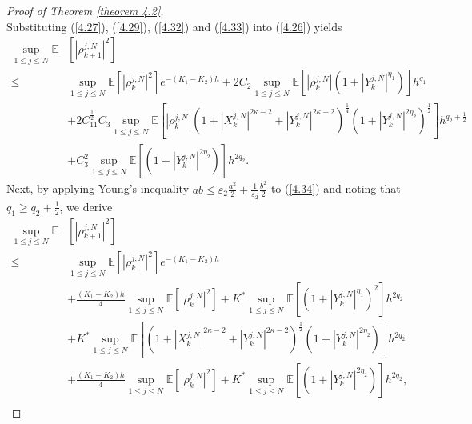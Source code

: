 \documentclass[12pt]{article}
\numberwithin{equation}{section}
\begin{document}
\begin{proof}[ Proof of Theorem \ref{theorem 4.2}]
\begin{equation}
\end{equation}
Substituting (\ref{4.27}), (\ref{4.29}), (\ref{4.32}) and (\ref{4.33}) into (\ref{4.26}) yields 
\begin{equation}\tag{5.47}\label{4.34}
\begin{aligned}
 \underset{1\leqslant j\leqslant N}{\sup}\mathbb{E}&\left[\left|\rho^{j,N}_{k+1}\right|^{2}\right]\\ 
\leq & \underset{1\leqslant j\leqslant N}{\sup}\mathbb{E}\left[\left|\rho^{j,N}_k\right|^{2}\right] e^{-\left(K_1-K_2\right)h} +2C_2 \underset{1\leqslant j\leqslant N}{\sup}\mathbb{E}\left[\left|\rho^{j,N}_k\right|\left(1+\left|Y^{j,N}_k\right|^{\eta_1}\right)\right] h^{q_1} \\
& +2C^{\frac{1}{2}}_{11}C_3\underset{1\leqslant j\leqslant N}{\sup}\mathbb{E}\left[\left|\rho^{j,N}_k\right|\left(1+\left|X^{j,N}_k\right|^{2 \kappa-2}+\left|Y^{j,N}_k\right|^{2 \kappa-2}\right)^{\frac{1}{4}} \left(1+\left|Y^{j,N}_k\right|^{2\eta_2}\right)^{\frac{1}{2}}\right]h^{q_2+\frac{1}{2}} \\
&+C^2_{3}\underset{1\leqslant j\leqslant N}{\sup}\mathbb{E} \left[ \left( 1+\left| Y_{k}^{j,N} \right|^{2\eta _2} \right) \right] h^{2q_2}.
\end{aligned}
\end{equation}
Next, by applying Young's inequality $ab\leq \varepsilon_{2} \tfrac{a^2}{2}+\tfrac{1}{\varepsilon_{2}}\tfrac{b^2}{2}$ to (\ref{4.34}) and noting that $q_1 \geq q_2+\tfrac{1}{2}$, we derive 
\begin{equation}\tag{5.48}\label{4.35}
\begin{aligned}
 \underset{1\leqslant j\leqslant N}{\sup}\mathbb{E}&\left[\left|\rho^{j,N}_{k+1}\right|^{2}\right]\\
\leq & \underset{1\leqslant j\leqslant N}{\sup}\mathbb{E}\left[\left|\rho^{j,N}_k\right|^{2}\right] e^{-\left(K_1-K_2\right)h} \\
&+\tfrac{\left(K_1-K_2\right) h}{4} \underset{1\leqslant j\leqslant N}{\sup}\mathbb{E}\left[\left|\rho^{j,N}_k\right|^2\right]+K^{*} \underset{1\leqslant j\leqslant N}{\sup}\mathbb{E}\left[\left(1+\left|Y^{j,N}_k\right|^{\eta_1}\right)^{2}\right] h^{2q_2} \\
&+K^{*} \underset{1\leqslant j\leqslant N}{\sup}\mathbb{E}\left[\left(1+\left|X^{j,N}_k\right|^{2 \kappa-2}+\left|Y^{j,N}_k\right|^{2 \kappa-2}\right)^{\frac{1}{2}}\left(1+\left|Y^{j,N}_k\right|^{2\eta_2}\right)\right] h^{2 q_2} \\
&+\tfrac{\left(K_1-K_2\right) h}{4} \underset{1\leqslant j\leqslant N}{\sup}\mathbb{E}\left[\left|\rho^{j,N}_k\right|^2\right] +K^{*} \underset{1\leqslant j\leqslant N}{\sup}\mathbb{E}\left[\left(1+\left|Y^{j,N}_k\right|^{2\eta_2}\right)\right] h^{2q_2},\\

\end{aligned}
\end{equation}
\end{proof}
\end{document}
